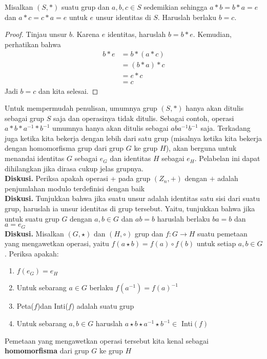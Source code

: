	\begin{theorem}
	Misalkan $(S,*)$ suatu grup dan $a,b,c \in S$ sedemikian sehingga $a * b = b * a = e$ dan $a * c = c * a = e$ untuk $e$ unsur identitas di $S$. Haruslah berlaku $b = c$.
	\end{theorem}
	\begin{proof}
		Tinjau unsur $b$. Karena $e$ identitas, haruslah $b = b * e$. Kemudian, perhatikan bahwa
		\begin{equation*}
		\begin{split}
		b * e & = b * (a * c)\\
		& = (b * a) * c\\
		& = e * c\\
		& = c
		\end{split}
		\end{equation*}
		Jadi $b = c$ dan kita selesai.
	\end{proof}
	Untuk mempermudah penulisan, umumnya grup $(S,*)$ hanya akan ditulis sebagai grup $S$ saja dan operasinya tidak ditulis. Sebagai contoh, operasi $a * b * a^{-1} * b^{-1}$ umumnya hanya akan ditulis sebagai $aba^{-1}b^{-1}$ saja. Terkadang juga ketika kita bekerja dengan lebih dari satu grup (misalnya ketika kita bekerja dengan homomorfisma grup dari grup $G$ ke grup $H$), akan berguna untuk menandai identitas $G$ sebagai $e_G$ dan identitas $H$ sebagai $e_H$. Pelabelan ini dapat dihilangkan jika dirasa cukup jelas grupnya.
	\\
	
	\textbf{Diskusi.} Periksa apakah operasi + pada grup $(Z_n, +)$ dengan $+$ adalah penjumlahan modulo terdefinisi dengan baik\\
	
	\textbf{Diskusi.} Tunjukkan bahwa jika suatu unsur adalah identitas satu sisi dari suatu grup, haruslah ia unsur identitas di grup tersebut. Yaitu, tunjukkan bahwa jika untuk suatu grup $G$ dengan $a,b \in G$ dan $ab = b$ haruslah berlaku $ba = b$ dan $a = e_G$\\
	
	\textbf{Diskusi.} Misalkan $(G,\star)$ dan $(H,\circ)$ grup dan $f: G \rightarrow H$ suatu pemetaan yang mengawetkan operasi, yaitu $f(a \star b) = f(a) \circ f(b)$ untuk setiap $a,b \in G$. Periksa apakah:
	\begin{enumerate}
		\item $f(e_G) = e_H$
		\item Untuk sebarang $a \in G$ berlaku $f(a^{-1}) = {f(a)}^{-1}$
		\item Peta($f$)dan Inti($f$) adalah suatu grup
		\item Untuk sebarang $a,b \in G$ haruslah $a \star b \star a^{-1} \star b^{-1} \in$ Inti$(f)$
	\end{enumerate}
	Pemetaan yang mengawetkan operasi tersebut kita kenal sebagai \textbf{homomorfisma} dari grup $G$ ke grup $H$